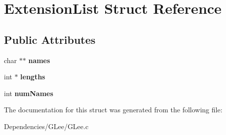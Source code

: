 \hypertarget{struct_extension_list}{\section{\-Extension\-List \-Struct \-Reference}
\label{struct_extension_list}
}
\subsection*{\-Public \-Attributes}
\begin{DoxyCompactItemize}
\item 
\hypertarget{struct_extension_list_a4ca8feba3982178f2cfdcc80d3a1bafc}{char $\ast$$\ast$ {\bfseries names}}\label{struct_extension_list_a4ca8feba3982178f2cfdcc80d3a1bafc}

\item 
\hypertarget{struct_extension_list_a187eb145322e0ec04fc4842054037aad}{int $\ast$ {\bfseries lengths}}\label{struct_extension_list_a187eb145322e0ec04fc4842054037aad}

\item 
\hypertarget{struct_extension_list_afbdc52d0b276a429ad3b31c9ba855531}{int {\bfseries num\-Names}}\label{struct_extension_list_afbdc52d0b276a429ad3b31c9ba855531}

\end{DoxyCompactItemize}


\-The documentation for this struct was generated from the following file\-:\begin{DoxyCompactItemize}
\item 
\-Dependencies/\-G\-Lee/\-G\-Lee.\-c\end{DoxyCompactItemize}
